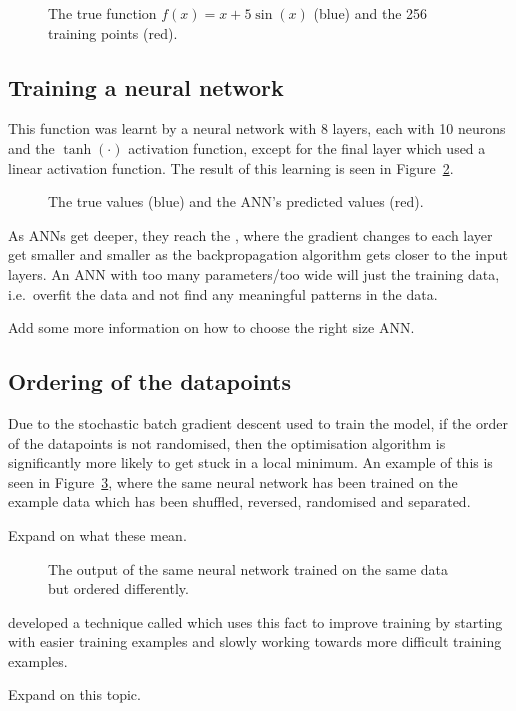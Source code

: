 \begin{figure}[htbp]
	\centering
	
	\caption{The true function \(f(x) = x + 5 \sin(x)\) (blue) and the 256 training points (red).}
	\label{fig:sin-x-dataset}
\end{figure}

\subsection{Training a neural network}

This function was learnt by a neural network with 8 layers, each with 10 neurons and the \(\tanh(\cdot)\) activation function, except for the final layer which used a linear activation function.
The result of this learning is seen in Figure~\ref{fig:ann-preds}.

\begin{figure}[htbp]
	\centering
	
	\caption{The true values (blue) and the ANN's predicted values (red).}
	\label{fig:ann-preds}
\end{figure}

As \acp{ANN} get deeper, they reach the , where the gradient changes to each layer get smaller and smaller as the backpropagation algorithm gets closer to the input layers.
An \ac{ANN} with too many parameters/too wide will just  the training data, i.e.\ overfit the data and not find any meaningful patterns in the data.

\begin{todo}
	Add some more information on how to choose the right size ANN.
\end{todo}

\subsection{Ordering of the datapoints}

Due to the stochastic batch gradient descent used to train the model, if the order of the datapoints is not randomised, then the optimisation algorithm is significantly more likely to get stuck in a local minimum.
An example of this is seen in Figure~\ref{fig:compare-order}, where the same neural network has been trained on the example data which has been shuffled, reversed, randomised and separated.

\begin{todo}
	Expand on what these mean.
\end{todo}

\begin{figure}[htbp]
	\centering
	
	\caption{The output of the same neural network trained on the same data but ordered differently.}
	\label{fig:compare-order}
\end{figure}

\textcite{bengio2009} developed a technique called  which uses this fact to improve training by starting with easier training examples and slowly working towards more difficult training examples.

\begin{todo}
	Expand on this topic.
\end{todo}
